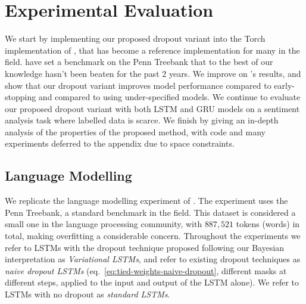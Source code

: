 \documentclass{article}
\theoremstyle{definition}
\begin{document}
\section{Experimental Evaluation}



We start by implementing our proposed dropout variant into the Torch implementation of \citet{zaremba2014recurrent}, that has become a reference implementation for many in the field. 
\citet{zaremba2014recurrent} have set a benchmark on the Penn Treebank that to the best of our knowledge hasn't been beaten for the past 2 years.
We improve on \citep{zaremba2014recurrent}'s results,
and show that our dropout variant improves model performance compared to early-stopping and compared to using under-specified models.
We continue to evaluate our proposed dropout variant with both LSTM and GRU models on a sentiment analysis task where labelled data is scarce. We finish by giving an in-depth analysis of the properties of the proposed method, with code and many experiments deferred to the appendix due to space constraints.

\subsection{Language Modelling}

We replicate the language modelling experiment of \citet*{zaremba2014recurrent}. 
The experiment uses the Penn Treebank, a standard benchmark in the field.
This dataset is considered a small one in the language processing community, with $887,521$ tokens (words) in total, making overfitting a considerable concern. 
Throughout the experiments we refer to LSTMs with the dropout technique proposed following our Bayesian interpretation as \textit{Variational LSTMs}, and refer to existing dropout techniques as \textit{naive dropout LSTMs} 
(eq.\ \eqref{eq:tied-weights-naive-dropout}, 
different masks at different steps, applied to the input and output of the LSTM alone). We refer to LSTMs with no dropout as \textit{standard LSTMs}. 
\end{document}
